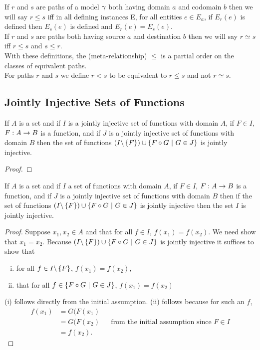 \noindent If $r$ and $s$ are paths of a model $\gamma$ both having domain $a$ and codomain $b$ then we will say $r \leq s$ iff in all defining instances E, for all entities $e \in E_a$, if $E_r(e)$ is defined then $E_s(e)$ is defined and $E_r(e)=E_s(e)$. \\

\noindent If $r$ and $s$ are paths both having source $a$ and destination $b$ then we will say $r \simeq s$ iff $r \leq s$ and $s \leq r$. \\

\noindent With these definitions,  the (meta-relationship) $\leq$ is a partial order on the classes of equivalent paths. \\

\noindent For paths $r$ and $s$ we define $r < s$ to be equivalent to $r \leq s$ and not $r \simeq s$. \\

\subsection{Jointly Injective Sets of Functions}
\begin{lemma}
\label{jointlyinjectivecomposition}
If $A$ is a set and if $I$  is a jointly injective set of functions with domain $A$, if $F \in I$, $F: A \rightarrow B$ is a function,
and if $J$ is a jointly injective set of functions with domain $B$ then the set of functions
$(I \backslash \left\{F\right\}) \cup \left\{F \circ G \ \middle|\ G \in J\right\}$ is jointly injective.
\end{lemma}
\begin{proof}

\end{proof}

\begin{lemma}
\label{jointlyinjectivefactorisation}
If $A$ is a set and if $I$  a set of functions with domain $A$, if $F \in I$, $F: A \rightarrow B$ is a function,
and if $J$ is a jointly injective set of functions with domain $B$ then if the set of functions
$(I \backslash \left\{F\right\}) \cup \left\{F \circ G \ \middle|\ G \in J\right\}$ is jointly injective then the
set $I$ is jointly injective.
\end{lemma}
\begin{proof}
Suppose $x_1,x_2 \in A$ and that for all $f \in I$, $f(x_1)=f(x_2)$. We need show that $x_1=x_2$.
Because $(I \backslash \left\{F\right\}) \cup \left\{F \circ G \ \middle|\ G \in J\right\}$ is jointly injective
it suffices to show that 
\begin{enumerate}[(i)]
\item
for all $f \in I \backslash \left\{F\right\}$, $f(x_1)=f(x_2)$, 
\item that for all $f \in \left\{F \circ G \ \middle|\ G \in J\right\}$, $f(x_1)=f(x_2)$
\end{enumerate}
(i) follows directly from the initial assumption. 
(ii) follows because for such an $f$, 
\begin{align*}
f(x_1)&=G(F(x_1) & & \\
      &=G(F(x_2) & & \mbox{from the initial assumption since }F \in I \\
			&=f(x_2). & &
\end{align*}
\end{proof}
